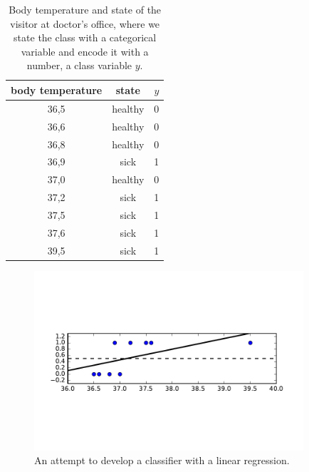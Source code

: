 \begin{refsection}
\begin{table}[htbp]
\caption{Body temperature and state of the visitor at doctor's office, where we state the class with a categorical variable and encode it with a number, a class variable $y$.}
\label{tab:temperature}
\begin{center}
\begin{tabular}{ccc}
\toprule
body temperature & state & $y$ \\
\midrule
36,5 & healthy & 0 \\
36,6 & healthy & 0 \\
36,8 & healthy & 0 \\
36,9 & sick & 1 \\
37,0 & healthy & 0 \\
37,2 & sick & 1 \\
37,5 & sick & 1 \\
37,6 & sick & 1 \\
39,5 & sick & 1 \\
\bottomrule
\end{tabular}
\end{center}
\end{table}

\begin{figure}[htbp]
\begin{center}
\includegraphics[width=10cm]{figures/class-linreg.pdf}
\caption{An attempt to develop a classifier with a linear regression.}
\label{f:class-linreg}
\end{center}
\end{figure}


\end{refsection}
